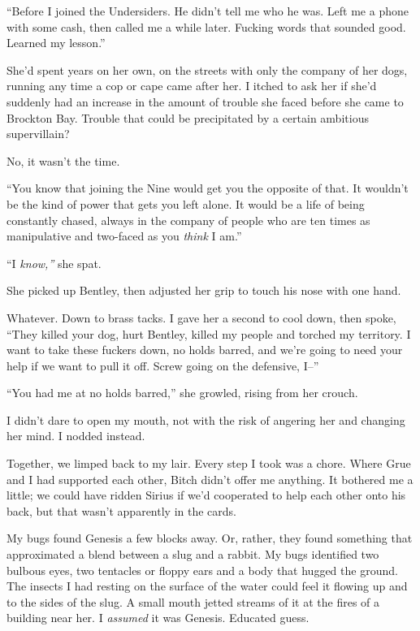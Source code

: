 ``Before I joined the Undersiders.  He didn't tell me who he was.  Left me a phone with some cash, then called me a while later.  Fucking words that sounded good.  Learned my lesson.''



She'd spent years on her own, on the streets with only the company of her dogs, running any time a cop or cape came after her.  I itched to ask her if she'd suddenly had an increase in the amount of trouble she faced before she came to Brockton Bay.  Trouble that could be precipitated by a certain ambitious supervillain?



No, it wasn't the time.



``You know that joining the Nine would get you the opposite of that.  It wouldn't be the kind of power that gets you left alone.  It would be a life of being constantly chased, always in the company of people who are ten times as manipulative and two-faced as you \emph{think} I am.''



``I \emph{know,'' }she spat.



She picked up Bentley, then adjusted her grip to touch his nose with one hand.



Whatever.  Down to brass tacks.  I gave her a second to cool down, then spoke, ``They killed your dog, hurt Bentley, killed my people and torched my territory.  I want to take these fuckers down, no holds barred, and we're going to need your help if we want to pull it off.  Screw going on the defensive, I--''



``You had me at no holds barred,'' she growled, rising from her crouch.



I didn't dare to open my mouth, not with the risk of angering her and changing her mind.  I nodded instead.



Together, we limped back to my lair.  Every step I took was a chore.  Where Grue and I had supported each other, Bitch didn't offer me anything.  It bothered me a little; we could have ridden Sirius if we'd cooperated to help each other onto his back, but that wasn't apparently in the cards.



My bugs found Genesis a few blocks away.  Or, rather, they found something that approximated a blend between a slug and a rabbit.  My bugs identified two bulbous eyes, two tentacles or floppy ears and a body that hugged the ground.  The insects I had resting on the surface of the water could feel it flowing up and to the sides of the slug.  A small mouth jetted streams of it at the fires of a building near her.  I \emph{assumed} it was Genesis.  Educated guess.



